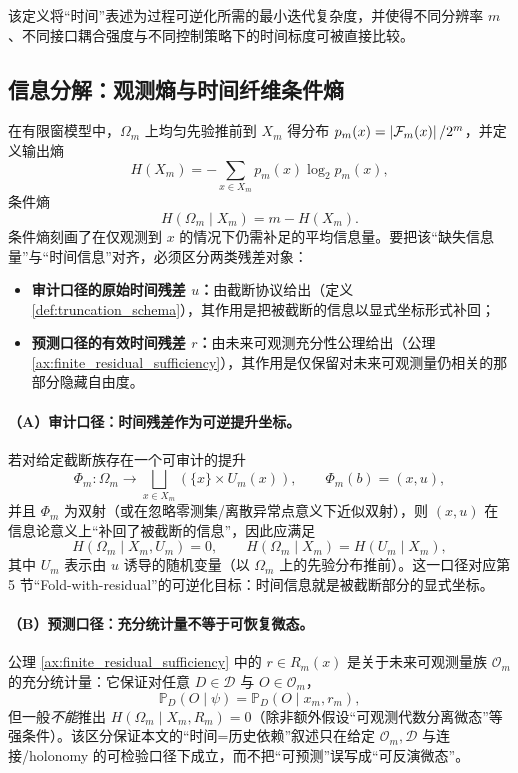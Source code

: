 该定义将“时间”表述为过程可逆化所需的最小迭代复杂度，并使得不同分辨率 $m$、不同接口耦合强度与不同控制策略下的时间标度可被直接比较。

\subsection{信息分解：观测熵与时间纤维条件熵}

在有限窗模型中，$\Omega_m$ 上均匀先验推前到 $X_m$ 得分布 $p_m(x)=\left\lvert \mathcal F_m(x)\right\rvert/2^m$，并定义输出熵
$$
H(X_m)=-\sum_{x\in X_m}p_m(x)\log_2 p_m(x),
$$
条件熵
$$
H(\Omega_m\mid X_m)=m-H(X_m).
$$
条件熵刻画了在仅观测到 $x$ 的情况下仍需补足的平均信息量。要把该“缺失信息量”与“时间信息”对齐，必须区分两类残差对象：
\begin{itemize}
  \item \textbf{审计口径的原始时间残差 $u$：}由截断协议给出（定义 \ref{def:truncation_schema}），其作用是把被截断的信息以显式坐标形式补回；
  \item \textbf{预测口径的有效时间残差 $r$：}由未来可观测充分性公理给出（公理 \ref{ax:finite_residual_sufficiency}），其作用是仅保留对未来可观测量仍相关的那部分隐藏自由度。
\end{itemize}

\paragraph{（A）审计口径：时间残差作为可逆提升坐标。}
若对给定截断族存在一个可审计的提升
$$
\Phi_m:\Omega_m\to \bigsqcup_{x\in X_m}(\{x\}\times U_m(x)),\qquad \Phi_m(b)=(x,u),
$$
并且 $\Phi_m$ 为双射（或在忽略零测集/离散异常点意义下近似双射），则 $(x,u)$ 在信息论意义上“补回了被截断的信息”，因此应满足
$$
H(\Omega_m\mid X_m,U_m)=0,
\qquad
H(\Omega_m\mid X_m)=H(U_m\mid X_m),
$$
其中 $U_m$ 表示由 $u$ 诱导的随机变量（以 $\Omega_m$ 上的先验分布推前）。这一口径对应第 5 节“Fold-with-residual”的可逆化目标：时间信息就是被截断部分的显式坐标。

\paragraph{（B）预测口径：充分统计量不等于可恢复微态。}
公理 \ref{ax:finite_residual_sufficiency} 中的 $r\in R_m(x)$ 是关于未来可观测量族 $\mathcal O_m$ 的充分统计量：它保证对任意 $D\in\mathcal D$ 与 $O\in\mathcal O_m$，
$$
\mathbb P_D(O\mid \psi)=\mathbb P_D(O\mid x_m,r_m),
$$
但一般\emph{不能}推出 $H(\Omega_m\mid X_m,R_m)=0$（除非额外假设“可观测代数分离微态”等强条件）。该区分保证本文的“时间=历史依赖”叙述只在给定 $\mathcal O_m,\mathcal D$ 与连接/holonomy 的可检验口径下成立，而不把“可预测”误写成“可反演微态”。

